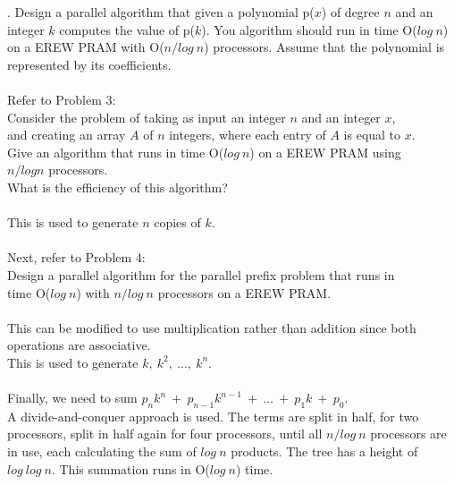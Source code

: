 \documentclass[10pt]{article}
\newcommand{\tab}{\hspace*{2em}}
\begin{document}
. Design a parallel algorithm that given a polynomial p($x$) of degree $n$ and an integer $k$ computes the value
of p($k$). You algorithm should run in time O($log~n$) on a EREW PRAM with O($n/log~n$) processors.
Assume that the polynomial is represented by its coefficients.\\
\\
Refer to Problem 3:\\
\tab Consider the problem of taking as input an integer $n$ and an integer $x$,\\
\tab and creating an array $A$ of $n$ integers, where each entry of $A$ is equal to $x$.\\
\tab Give an algorithm that runs in time O($log~n$) on a EREW PRAM using\\
\tab $n/log n$ processors.\\
\tab What is the efficiency of this algorithm?\\
\\
This is used to generate $n$ copies of $k$.\\
\\
Next, refer to Problem 4:\\
\tab Design a parallel algorithm for the parallel prefix problem that runs in\\
\tab time O($log~n$) with $n/log~n$ processors on a EREW PRAM.\\
\\
This can be modified to use multiplication rather than addition since both operations are associative.\\
This is used to generate $k,~k^2,~\ldots,~ k^n$.\\
\\
Finally, we need to sum $p_nk^n~+~p_{n-1}k^{n-1}~+~\ldots~+~p_1k~+~p_0$.\\
A divide-and-conquer approach is used. The terms are split in half, for two processors, split in half again for four processors, 
until all $n/log~n$ processors are in use, each calculating the sum of $log~n$ products. The tree has a height of $log~log~n$.
This summation runs in O($log~n$) time.\\
\end{document}
